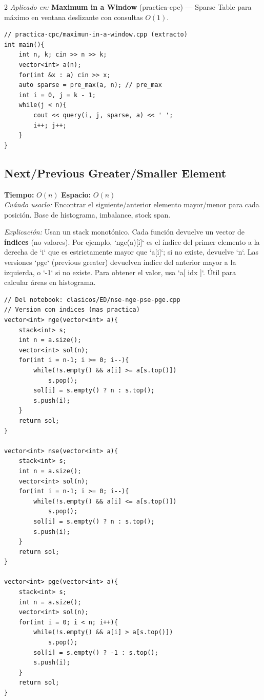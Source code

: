 \documentclass[10pt,a4paper]{article}
\begin{document}
\begin{multicols}{2}
\textit{Aplicado en:} \textbf{Maximum in a Window} (practica-cpc) --- Sparse Table para m\'aximo en ventana deslizante con consultas $O(1)$.

\begin{lstlisting}
// practica-cpc/maximun-in-a-window.cpp (extracto)
int main(){
    int n, k; cin >> n >> k;
    vector<int> a(n);
    for(int &x : a) cin >> x;
    auto sparse = pre_max(a, n); // pre_max
    int i = 0, j = k - 1;
    while(j < n){
        cout << query(i, j, sparse, a) << ' ';
        i++; j++;
    }
}
\end{lstlisting}

\subsection{Next/Previous Greater/Smaller Element}
\textbf{Tiempo:} $O(n)$ \quad \textbf{Espacio:} $O(n)$\\
\textit{Cu\'ando usarlo:} Encontrar el siguiente/anterior elemento mayor/menor para cada posici\'on. Base de histograma, imbalance, stock span.

\textit{Explicación:} Usan un stack monotónico. Cada función devuelve un vector de \textbf{índices} (no valores). Por ejemplo, `nge(a)[i]` es el índice del primer elemento a la derecha de `i` que es estrictamente mayor que `a[i]`; si no existe, devuelve `n`. Las versiones `pge` (previous greater) devuelven índice del anterior mayor a la izquierda, o `-1` si no existe. Para obtener el valor, usa `a[ idx ]`. Útil para calcular áreas en histograma.

\begin{lstlisting}
// Del notebook: clasicos/ED/nse-nge-pse-pge.cpp
// Version con indices (mas practica)
vector<int> nge(vector<int> a){
    stack<int> s;
    int n = a.size();
    vector<int> sol(n);
    for(int i = n-1; i >= 0; i--){
        while(!s.empty() && a[i] >= a[s.top()])
            s.pop();
        sol[i] = s.empty() ? n : s.top();
        s.push(i);
    }
    return sol;
}

vector<int> nse(vector<int> a){
    stack<int> s;
    int n = a.size();
    vector<int> sol(n);
    for(int i = n-1; i >= 0; i--){
        while(!s.empty() && a[i] <= a[s.top()])
            s.pop();
        sol[i] = s.empty() ? n : s.top();
        s.push(i);
    }
    return sol;
}

vector<int> pge(vector<int> a){
    stack<int> s;
    int n = a.size();
    vector<int> sol(n);
    for(int i = 0; i < n; i++){
        while(!s.empty() && a[i] > a[s.top()])
            s.pop();
        sol[i] = s.empty() ? -1 : s.top();
        s.push(i);
    }
    return sol;
}


\end{lstlisting}
\end{multicols}
\end{document}

